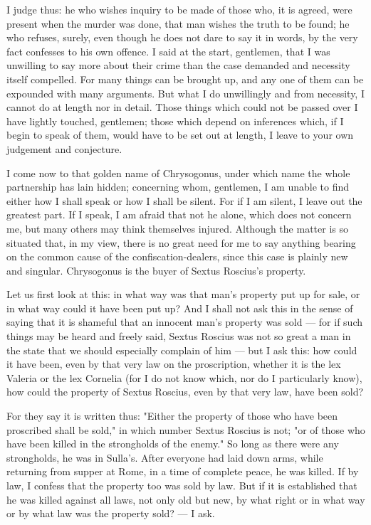  I judge thus: he who wishes inquiry to be made of those who, it is agreed, were present when the murder was done, that man wishes the truth to be found; he who refuses, surely, even though he does not dare to say it in words, by the very fact confesses to his own offence. I said at the start, gentlemen, that I was unwilling to say more about their crime than the case demanded and necessity itself compelled. For many things can be brought up, and any one of them can be expounded with many arguments. But what I do unwillingly and from necessity, I cannot do at length nor in detail. Those things which could not be passed over I have lightly touched, gentlemen; those which depend on inferences which, if I begin to speak of them, would have to be set out at length, I leave to your own judgement and conjecture.

 I come now to that golden name of Chrysogonus, under which name the whole partnership has lain hidden; concerning whom, gentlemen, I am unable to find either how I shall speak or how I shall be silent. For if I am silent, I leave out the greatest part. If I speak, I am afraid that not he alone, which does not concern me, but many others may think themselves injured. Although the matter is so situated that, in my view, there is no great need for me to say anything bearing on the common cause of the confiscation-dealers, since this case is plainly new and singular. Chrysogonus is the buyer of Sextus Roscius's property.

 Let us first look at this: in what way was that man's property put up for sale, or in what way could it have been put up? And I shall not ask this in the sense of saying that it is shameful that an innocent man's property was sold --- for if such things may be heard and freely said, Sextus Roscius was not so great a man in the state that we should especially complain of him --- but I ask this: how could it have been, even by that very law on the proscription, whether it is the lex Valeria or the lex Cornelia (for I do not know which, nor do I particularly know), how could the property of Sextus Roscius, even by that very law, have been sold?

 For they say it is written thus: "Either the property of those who have been proscribed shall be sold," in which number Sextus Roscius is not; "or of those who have been killed in the strongholds of the enemy." So long as there were any strongholds, he was in Sulla's. After everyone had laid down arms, while returning from supper at Rome, in a time of complete peace, he was killed. If by law, I confess that the property too was sold by law. But if it is established that he was killed against all laws, not only old but new, by what right or in what way or by what law was the property sold? --- I ask.

